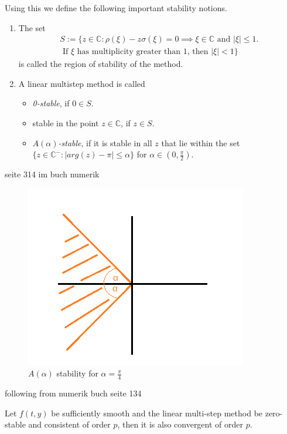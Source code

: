 	Using this we define the following important stability notions.
	\begin{definition}
		\begin{enumerate}
			\item 
			The set
			\begin{equation}
				\begin{aligned}
					S := \{z \in \mathbb{C} : \rho(\xi) - z \sigma(\xi) = 0 \implies \xi \in \mathbb{C} \text{ and } |\xi| \leq 1. \\
					\text{ If $\xi$ has multiplicity greater than $1$, then } |\xi| < 1\}
				\end{aligned}
			\end{equation}
			is called the region of stability of the method.
			\item 
			A linear multistep method is called
			\begin{itemize}
				\item \emph{0-stable}, if $0 \in S$.
				\item stable in the point $z \in \mathbb{C}$, if $z \in S$.
				\item \emph{$A(\alpha)$-stable}, if it is stable in all $z$ that lie within the set $\{z \in \mathbb{C}^- : |arg(z)-\pi| \leq \alpha\}$ for $\alpha \in (0, \frac{\pi}{2})$.		 
			\end{itemize}
		\end{enumerate}
	\end{definition}
	
	seite 314 im buch numerik 
	
	\begin{figure}[H]
		\centering
		\includegraphics[width=0.3\linewidth]{screenshot021}
		\caption{$A(\alpha)$ stability for $\alpha = \frac{\pi}{4}$}
		\label{fig:screenshot021}
	\end{figure}
	
	following from numerik buch seite 134
	\begin{theorem}
		\label{th: null-stbaility and consistence is convergence}
		Let $f(t,y)$ be sufficiently smooth and the linear multi-step method be zero-stable and consistent of order $p$, then it is also convergent of order $p$.
	\end{theorem}
	
